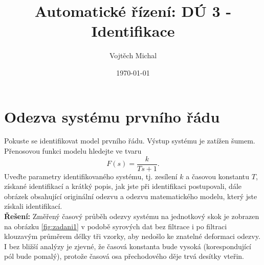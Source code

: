 \documentclass[twoside]{article}
\title{Automatické řízení: DÚ 3 - Identifikace}
\author{Vojtěch Michal}
\date{\today}
\begin{document}
\maketitle


\newcommand{\rad}{{rad}}
\renewcommand{\norm}{{norm}}
\renewcommand{\tan}{{tan}}

\section{Odezva systému prvního řádu}
Pokuste se identifikovat model prvního řádu. Výstup systému je zatížen šumem. Přenosovou funkci
modelu hledejte ve tvaru
\begin{equation}
	\label{eq:obecne1}
	F(s) = \frac{k}{Ts + 1}.
\end{equation}
Uveďte parametry identifikovaného systému, tj. zesílení $k$ a časovou konstantu $T$, získané identifikací a
krátký popis, jak jste při identifikaci postupovali, 
dále obrázek obsahující originální odezvu a odezvu matematického modelu, který jste získali identifikací. \\
\textbf{Řešení:} Změřený časový průběh odezvy systému na jednotkový skok je zobrazen na obrázku \ref{fig:zadani1}
v podobě syrových dat bez filtrace i po filtraci klouzavým průměrem délky tři vzorky, aby nedošlo ke znatelné deformaci odezvy.
I bez bližší analýzy je zjevné, že časová konstanta bude vysoká (korespondující pól bude pomalý), protože časová osa
přechodového děje trvá desítky vteřin. 
\end{document}
